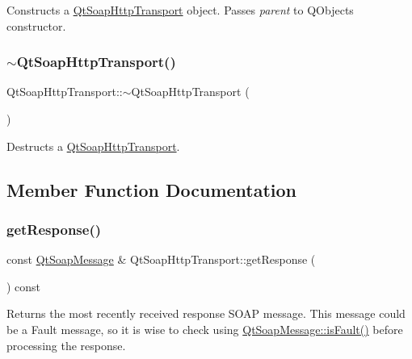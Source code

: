 Constructs a \mbox{\hyperlink{class_qt_soap_http_transport}{Qt\+Soap\+Http\+Transport}} object. Passes {\itshape parent} to Q\+Object\textquotesingle{}s constructor. \mbox{\label{class_qt_soap_http_transport_a1884800f50975eabf79f5ef2b4c2dc03}} 
\subsubsection{\texorpdfstring{$\sim$\+Qt\+Soap\+Http\+Transport()}{~QtSoapHttpTransport()}}
{\footnotesize\ttfamily Qt\+Soap\+Http\+Transport\+::$\sim$\+Qt\+Soap\+Http\+Transport (\begin{DoxyParamCaption}{ }\end{DoxyParamCaption})}

Destructs a \mbox{\hyperlink{class_qt_soap_http_transport}{Qt\+Soap\+Http\+Transport}}. 

\subsection{Member Function Documentation}
\mbox{\label{class_qt_soap_http_transport_a85f606ff295d200c387e85a710692c59}} 
\subsubsection{\texorpdfstring{get\+Response()}{getResponse()}}
{\footnotesize\ttfamily const \mbox{\hyperlink{class_qt_soap_message}{Qt\+Soap\+Message}} \& Qt\+Soap\+Http\+Transport\+::get\+Response (\begin{DoxyParamCaption}{ }\end{DoxyParamCaption}) const}

Returns the most recently received response S\+O\+AP message. This message could be a Fault message, so it is wise to check using \mbox{\hyperlink{class_qt_soap_message_a7aa7a55d9f593144499f8622e8aa1ce5}{Qt\+Soap\+Message\+::is\+Fault()}} before processing the response. \mbox{\label{class_qt_soap_http_transport_af3c8834f62181744fb6089cd50e1b184}} 
